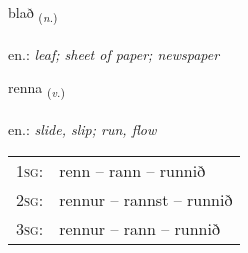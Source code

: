 \documentclass[frontgrid, backgrid]{flacards}\usepackage[]{graphicx}\usepackage[]{xcolor}
\begin{document}
\renewcommand{\flhead}{\vskip5pt \fboxsep=0pt {\small\bfseries\footnotesize Nafnorð | Noun}}
\renewcommand{\fcfoot}{\vskip5pt \fboxsep=0pt \hspace{2pt}{\small\bfseries\footnotesize 1K}}

\renewcommand{\blhead}{\vskip5pt {\small\bfseries\footnotesize Nafnorð | Noun }}
\renewcommand{\bcfoot}{\vskip5pt \hspace{2pt}{\small\bfseries\footnotesize 1K}}


{blað \small{\textsubscript{(\textit{n.})}} \\[1ex] %
\textphonetic{[plaːð]} \\
en.: \emph{leaf; sheet of paper; newspaper} \\  [2ex]
\renewcommand*{\arraystretch}{0.8}
}

\renewcommand{\flhead}{\vskip5pt \fboxsep=0pt {\small\bfseries\footnotesize Sagnorð | Verb}}
\renewcommand{\fcfoot}{\vskip5pt \fboxsep=0pt \hspace{2pt}{\small\bfseries\footnotesize 1K}}

\renewcommand{\blhead}{\vskip5pt {\small\bfseries\footnotesize Sagnorð | Verb }}
\renewcommand{\bcfoot}{\vskip5pt \hspace{2pt}{\small\bfseries\footnotesize 1K}}


{renna \small{\textsubscript{(\textit{v.})}} \\[1ex] %
\textphonetic{[rɛna]} \\
en.: \emph{slide, slip; run, flow} \\  [2ex]
\renewcommand*{\arraystretch}{0.8}
\begin{tabular}{p{1cm}l}
\textsc{1sg}: & renn -- rann -- runnið \\ 
\textsc{2sg}: & rennur -- rannst -- runnið \\ 
\textsc{3sg}: & rennur -- rann -- runnið \\ 
\end{tabular}
}
\end{document}
